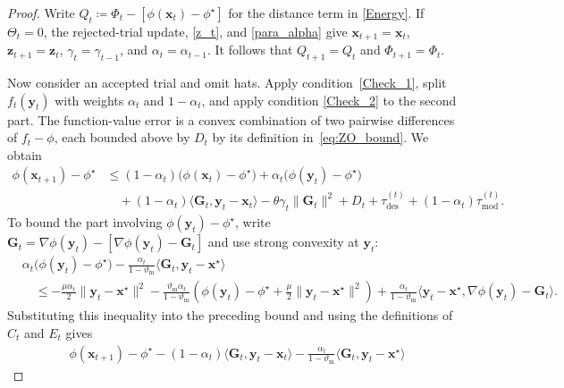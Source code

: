 \documentclass{article}
\begin{document}
\begin{proof}

Write  \(Q_t\coloneqq \Phi_t-[\phi(\bm{x}_t)-\phi^\star]\) for the distance term in \eqref{Energy}.  
If \(\Theta_t=0\), the rejected-trial update, \eqref{z_t}, and
\eqref{para_alpha} give
\(\bm{x}_{t+1}=\bm{x}_t\), \(\bm{z}_{t+1}=\bm{z}_t\),
\(\gamma_t=\gamma_{t-1}\), and \(\alpha_t=\alpha_{t-1}\).
It follows that $Q_{t+1}=Q_t$ and $\Phi_{t+1}=\Phi_t$.

Now consider an accepted trial and omit hats. Apply
condition~\eqref{Check_1}, split $f_t(\bm{y}_t)$ with weights $\alpha_t$ and $1-\alpha_t$, and apply condition \eqref{Check_2} to the second part. 
The function-value error is a convex combination of two pairwise differences of \(f_t-\phi\), each bounded above by \(D_t\) by its definition in~\eqref{eq:ZO_bound}. We obtain
\[
\begin{aligned}
\phi(\bm{x}_{t+1})-\phi^\star
&\le
(1-\alpha_t)\bigl(\phi(\bm{x}_t)-\phi^\star\bigr)
+\alpha_t\bigl(\phi(\bm{y}_t)-\phi^\star\bigr)\\
&\quad
+(1-\alpha_t)\langle\mathbf{G}_t,\bm{y}_t-\bm{x}_t\rangle
-\theta\gamma_t\|\mathbf{G}_t\|^2
+D_t+\tau_{\mathrm{des}}^{(t)}
+(1-\alpha_t)\tau_{\mathrm{mod}}^{(t)}.
\end{aligned}
\]
To bound the part involving $\phi(\bm{y}_t)-\phi^\star$, write $\mathbf{G}_t=\nabla\phi(\bm{y}_t)-[\nabla\phi(\bm{y}_t)-\mathbf{G}_t]$ and use strong convexity at $\bm{y}_t$:
\begin{equation}\label{eq:energy_comparison_minimizer}
\begin{aligned}
&\alpha_t\bigl(\phi(\bm{y}_t)-\phi^\star\bigr)
-\frac{\alpha_t}{1-\vartheta_{\mathrm{m}}}
\langle\mathbf{G}_t,\bm{y}_t-\bm{x}^\star\rangle\\
&\quad\le
-\frac{\mu\alpha_t}{2}\|\bm{y}_t-\bm{x}^\star\|^2
-\frac{\vartheta_{\mathrm{m}}\alpha_t}{1-\vartheta_{\mathrm{m}}}
\left(
\phi(\bm{y}_t)-\phi^\star
+\frac{\mu}{2}\|\bm{y}_t-\bm{x}^\star\|^2
\right)
+\frac{\alpha_t}{1-\vartheta_{\mathrm{m}}}
\langle \bm{y}_t-\bm{x}^\star,\nabla\phi(\bm{y}_t)-\mathbf{G}_t\rangle.
\end{aligned}
\end{equation}
Substituting this inequality into the preceding bound and using the definitions of $C_t$ and $E_t$ gives
\begin{align}
&\phi(\bm{x}_{t+1})-\phi^\star
-(1-\alpha_t)\langle\mathbf{G}_t,\bm{y}_t-\bm{x}_t\rangle
-\frac{\alpha_t}{1-\vartheta_{\mathrm{m}}}
\langle\mathbf{G}_t,\bm{y}_t-\bm{x}^\star\rangle

\end{align}
\end{proof}
\end{document}
